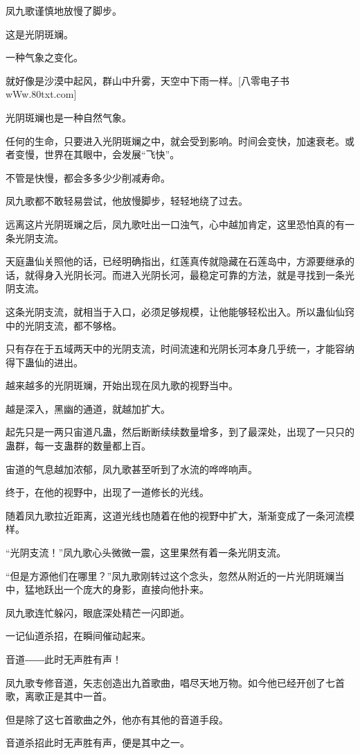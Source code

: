 \begin{this_body}
凤九歌谨慎地放慢了脚步。

这是光阴斑斓。

一种气象之变化。

就好像是沙漠中起风，群山中升雾，天空中下雨一样。[八零电子书wWw.80txt.com]

光阴斑斓也是一种自然气象。

任何的生命，只要进入光阴斑斓之中，就会受到影响。时间会变快，加速衰老。或者变慢，世界在其眼中，会发展“飞快”。

不管是快慢，都会多多少少削减寿命。

凤九歌都不敢轻易尝试，他放慢脚步，轻轻地绕了过去。

远离这片光阴斑斓之后，凤九歌吐出一口浊气，心中越加肯定，这里恐怕真的有一条光阴支流。

天庭蛊仙关照他的话，已经明确指出，红莲真传就隐藏在石莲岛中，方源要继承的话，就得身入光阴长河。而进入光阴长河，最稳定可靠的方法，就是寻找到一条光阴支流。

这条光阴支流，就相当于入口，必须足够规模，让他能够轻松出入。所以蛊仙仙窍中的光阴支流，都不够格。

只有存在于五域两天中的光阴支流，时间流速和光阴长河本身几乎统一，才能容纳得下蛊仙的进出。

越来越多的光阴斑斓，开始出现在凤九歌的视野当中。

越是深入，黑幽的通道，就越加扩大。

起先只是一两只宙道凡蛊，然后断断续续数量增多，到了最深处，出现了一只只的蛊群，每一支蛊群的数量都上百。

宙道的气息越加浓郁，凤九歌甚至听到了水流的哗哗响声。

终于，在他的视野中，出现了一道修长的光线。

随着凤九歌拉近距离，这道光线也随着在他的视野中扩大，渐渐变成了一条河流模样。

“光阴支流！”凤九歌心头微微一震，这里果然有着一条光阴支流。

“但是方源他们在哪里？”凤九歌刚转过这个念头，忽然从附近的一片光阴斑斓当中，猛地跃出一个庞大的身影，直接向他扑来。

凤九歌连忙躲闪，眼底深处精芒一闪即逝。

一记仙道杀招，在瞬间催动起来。

音道――此时无声胜有声！

凤九歌专修音道，矢志创造出九首歌曲，唱尽天地万物。如今他已经开创了七首歌，离歌正是其中一首。

但是除了这七首歌曲之外，他亦有其他的音道手段。

音道杀招此时无声胜有声，便是其中之一。


\end{this_body}
